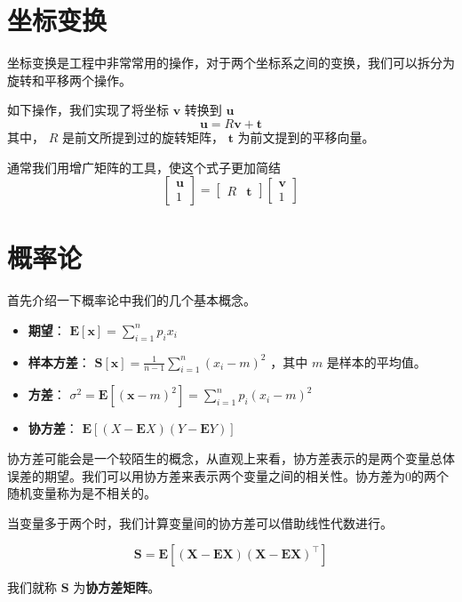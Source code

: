 \section{坐标变换}

坐标变换是工程中非常常用的操作，对于两个坐标系之间的变换，我们可以拆分为旋转和平移两个操作。

如下操作，我们实现了将坐标 $\mathbf v$ 转换到 $\mathbf u$ 
$$
\mathbf u =R\mathbf v+\mathbf t
$$
其中， $R$ 是前文所提到过的旋转矩阵， $\mathbf t$ 为前文提到的平移向量。

通常我们用增广矩阵的工具，使这个式子更加简结
$$
\begin{bmatrix}
\mathbf u\\1
\end{bmatrix}=
\begin{bmatrix}
	R & \mathbf t
\end{bmatrix}
\begin{bmatrix}
	\mathbf v\\1
\end{bmatrix}
$$

\section{概率论}

首先介绍一下概率论中我们的几个基本概念。

\begin{itemize}
	\item \textbf{期望}： $\mathbf{E}[\mathbf x]=\sum_{i=1}^np_ix_i$
	\item \textbf{样本方差}： $\mathbf S[\mathbf x]=\frac{1}{n-1}\sum_{i=1}^n(x_i-m)^2$ ，其中 $m$ 是样本的平均值。
	\item \textbf{方差}： $\sigma^2=\mathbf E[(\mathbf x-m)^2]=\sum_{i=1}^np_i(x_i-m)^2$
	\item \textbf{协方差}： $\mathbf E[(X-\mathbf E X)(Y -\mathbf E Y)]$
\end{itemize}

协方差可能会是一个较陌生的概念，从直观上来看，协方差表示的是两个变量总体误差的期望。我们可以用协方差来表示两个变量之间的相关性。协方差为0的两个随机变量称为是不相关的。

当变量多于两个时，我们计算变量间的协方差可以借助线性代数进行。

$$
\mathbf S=\mathbf E[(\mathbf X-\mathbf E \mathbf X)(\mathbf X -\mathbf E \mathbf X)^\top]
$$

我们就称 $\mathbf S$ 为\textbf{协方差矩阵}。

